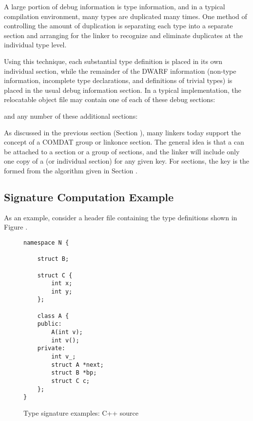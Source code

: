 A large portion of debug information is type information, and
in a typical compilation environment, many types are duplicated
many times. One method of controlling the amount of duplication
is separating each type into a separate 
\dotdebugtypes{} section
and arranging for the linker to recognize and eliminate
duplicates at the individual type level.

Using this technique, each substantial type definition is
placed in its own individual section, while the remainder
of the DWARF information (non-type information, incomplete
type declarations, and definitions of trivial types) is
placed in the usual debug information section. In a typical
implementation, the relocatable object file may contain one
of each of these debug sections:

\begin{alltt}
\dotdebugabbrev{}
\dotdebuginfo{}
\dotdebugline{}
\end{alltt}

and any number of these additional sections:

\begin{alltt}
\dotdebugtypes{}
\end{alltt}

As discussed in the previous section 
(Section ), 
many
linkers today support the concept of a COMDAT group or
linkonce section. The general idea is that a  can be
attached to a section or a group of sections, and the linker
will include only one copy of a 
(or individual section) for any given key. 
For 
\dotdebugtypes{} sections, the
key is the 
formed from the algorithm given in
Section .

\subsection{Signature Computation Example}
\label{app:signaturecomputationexample}

As an example, 
consider a  header file 
containing the type definitions shown
in Figure .

\begin{figure}[h]
\begin{lstlisting}
namespace N {

    struct B;

    struct C {
        int x;
        int y;
    };

    class A {
    public:
        A(int v);
        int v();
    private:
        int v_;
        struct A *next;
        struct B *bp;
        struct C c;
    };
}
\end{lstlisting}
\caption{Type signature examples: C++ source}
\label{fig:typesignatureexamplescsource}
\end{figure}

